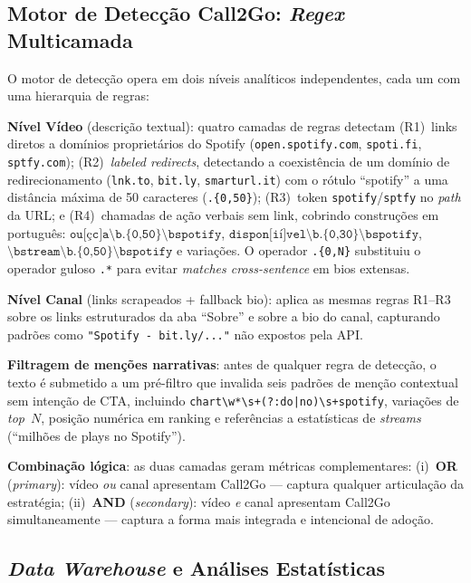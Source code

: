 ﻿\documentclass[12pt]{article}
\begin{document}
\subsection{Motor de Detecção Call2Go: \textit{Regex} Multicamada}
\label{sec:detector}

O motor de detecção opera em dois níveis analíticos independentes, cada um
com uma hierarquia de regras:

\textbf{Nível Vídeo} (descrição textual): quatro camadas de regras detectam
(R1)~links diretos a domínios proprietários do Spotify
(\texttt{open.spotify.com}, \texttt{spoti.fi}, \texttt{sptfy.com});
(R2)~\textit{labeled redirects}, detectando a coexistência de um domínio de
redirecionamento (\texttt{lnk.to}, \texttt{bit.ly}, \texttt{smarturl.it})
com o rótulo ``spotify'' a uma distância máxima de 50 caracteres
(\texttt{.\{0,50\}}); (R3)~token \texttt{spotify}/\texttt{sptfy} no
\textit{path} da URL; e (R4)~chamadas de ação verbais sem link, cobrindo
construções em português:
$\texttt{ou[çc]a\textbackslash b.\{0,50\}\textbackslash bspotify}$,
$\texttt{dispon[ií]vel\textbackslash b.\{0,30\}\textbackslash bspotify}$,
$\texttt{\textbackslash bstream\textbackslash b.\{0,50\}\textbackslash bspotify}$
e variações. O operador \texttt{.\{0,N\}} substituiu o operador guloso
\texttt{.*} para evitar \textit{matches cross-sentence} em bios extensas.

\textbf{Nível Canal} (links scrapeados + fallback bio): aplica as mesmas
regras R1--R3 sobre os links estruturados da aba ``Sobre'' e sobre a bio do
canal, capturando padrões como \texttt{"Spotify - bit.ly/..."} não expostos
pela API.

\textbf{Filtragem de menções narrativas}: antes de qualquer regra de
detecção, o texto é submetido a um pré-filtro que invalida seis padrões de
menção contextual sem intenção de CTA, incluindo
\texttt{chart\textbackslash w*\textbackslash s+(?:do|no)\textbackslash s+spotify},
variações de \textit{top}~$N$, posição numérica em ranking e referências a
estatísticas de \textit{streams} (``milhões de plays no Spotify'').

\textbf{Combinação lógica}: as duas camadas geram métricas complementares:
(i)~\textbf{OR} (\textit{primary}): vídeo \textit{ou} canal apresentam Call2Go
--- captura qualquer articulação da estratégia;
(ii)~\textbf{AND} (\textit{secondary}): vídeo \textit{e} canal apresentam
Call2Go simultaneamente --- captura a forma mais integrada e intencional de
adoção.

\subsection{\textit{Data Warehouse} e Análises Estatísticas}
\end{document}
